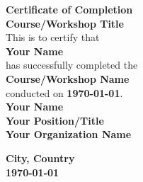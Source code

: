 \documentclass[a4paper,11pt]{article}
\begin{document}
\begin{center}
    {\LARGE \textbf{Certificate of Completion}}\\[0.5cm]
    {\LARGE \textbf{Course/Workshop Title}}\\[1cm]

    This is to certify that\\[0.5cm]
    \textbf{Your Name}\\[0.5cm]
    has successfully completed the\\[0.5cm]
    \textbf{Course/Workshop Name}\\[0.5cm]
    conducted on \textbf{\today}.\\[1cm]

    \vspace{1cm}
    \textbf{Your Name}\\
    \textbf{Your Position/Title}\\
    \textbf{Your Organization Name}\\[1cm]

    \vfill

    \textbf{City, Country}\\
    \textbf{\today}
\end{center}
\end{document}
